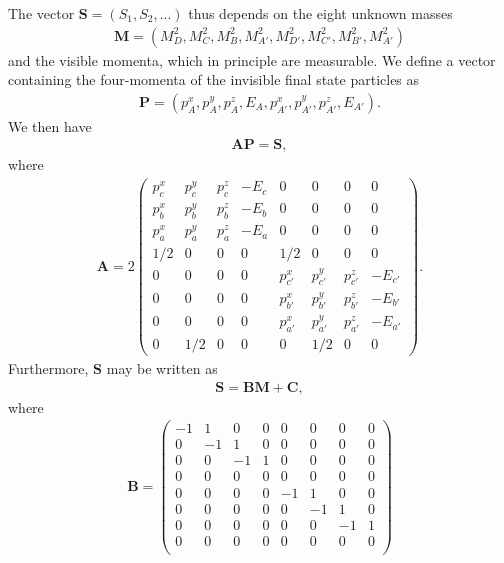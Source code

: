 \documentclass[twoside,english]{uiofysmaster}
\begin{document}
The vector $\mathbf{S} = (S_1, S_2, ...)$ thus depends on the eight unknown masses 
\begin{align}
	\mathbf{M} = (M_D^2, M_C^2, M_B^2, M_{A'}^2, M_{D'}^2, M_{C'}^2, M_{B'}^2, M_{A'}^2)
\end{align}
and the visible momenta, which in principle are measurable. We define a vector containing the four-momenta of the invisible final state particles as
\begin{align}
	\mathbf{P} = (p_A^x, p_A^y, p_A^z, E_A, p_{A'}^x, p_{A'}^y, p_{A'}^z, E_{A'}). \label{eq:Pvec}
\end{align}
We then have
\begin{align}
	\mathbf{A}\mathbf{P} = \mathbf{S},\label{eq:APS}
\end{align}
where
\begin{align}
	\mathbf{A} = 2 \begin{pmatrix}
						p_c^x & p_c^y & p_c^z & -E_c & 0 & 0 & 0 & 0 \\
						p_b^x & p_b^y & p_b^z & -E_b & 0 & 0 & 0 & 0 \\
						p_a^x & p_a^y & p_a^z & -E_a & 0 & 0 & 0 & 0 \\
						1/2 & 0 & 0 & 0 & 1/2 & 0 & 0 & 0\\
						0 & 0 & 0 & 0 & p_{c'}^x & p_{c'}^y & p_{c'}^z & -E_{c'} \\
						0 & 0 & 0 & 0 & p_{b'}^x & p_{b'}^y & p_{b'}^z & -E_{b'} \\
						0 & 0 & 0 & 0 & p_{a'}^x & p_{a'}^y & p_{a'}^z & -E_{a'} \\
						0 & 1/2 & 0 & 0 & 0 & 1/2 & 0 & 0
					\end{pmatrix}. \label{eq:Amatrix_orig}
\end{align}
Furthermore, $\mathbf{S}$ may be written as 
\begin{align}
	\mathbf{S} = \mathbf{B} \mathbf{M} + \mathbf{C},\label{eq:SBMC}
\end{align}
where
\begin{align}
	\mathbf{B} = \begin{pmatrix}
					-1 & 1 & 0 & 0 & 0 & 0 & 0 & 0 \\
					0 & -1 & 1 & 0 & 0 & 0 & 0 & 0 \\
					0 & 0 & -1 & 1 & 0 & 0 & 0 & 0 \\
					0 & 0 & 0 & 0 & 0 & 0 & 0 & 0 \\
					0 & 0 & 0 & 0 & -1 & 1 & 0 & 0 \\
					0 & 0 & 0 & 0 & 0 & -1 & 1 & 0 \\
					0 & 0 & 0 & 0 & 0 & 0 & -1 & 1 \\
					0 & 0 & 0 & 0 & 0 & 0 & 0 & 0 \\
	\end{pmatrix}
\end{align}
\end{document}

